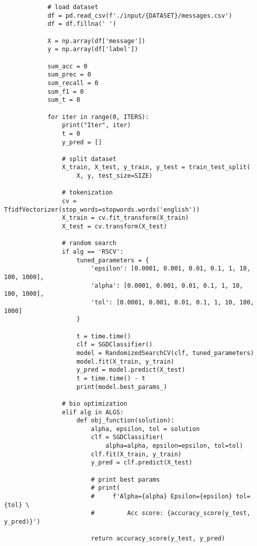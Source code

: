 \begin{lstlisting}
            # load dataset
            df = pd.read_csv(f'./input/{DATASET}/messages.csv')
            df = df.fillna(' ')

            X = np.array(df['message'])
            y = np.array(df['label'])

            sum_acc = 0
            sum_prec = 0
            sum_recall = 0
            sum_f1 = 0
            sum_t = 0

            for iter in range(0, ITERS):
                print("Iter", iter)
                t = 0
                y_pred = []

                # split dataset
                X_train, X_test, y_train, y_test = train_test_split(
                    X, y, test_size=SIZE)

                # tokenization
                cv = TfidfVectorizer(stop_words=stopwords.words('english'))
                X_train = cv.fit_transform(X_train)
                X_test = cv.transform(X_test)

                # random search
                if alg == 'RSCV':
                    tuned_parameters = {
                        'epsilon': [0.0001, 0.001, 0.01, 0.1, 1, 10, 100, 1000],
                        'alpha': [0.0001, 0.001, 0.01, 0.1, 1, 10, 100, 1000],
                        'tol': [0.0001, 0.001, 0.01, 0.1, 1, 10, 100, 1000]
                    }

                    t = time.time()
                    clf = SGDClassifier()
                    model = RandomizedSearchCV(clf, tuned_parameters)
                    model.fit(X_train, y_train)
                    y_pred = model.predict(X_test)
                    t = time.time() - t
                    print(model.best_params_)

                # bio optimization
                elif alg in ALGS:
                    def obj_function(solution):
                        alpha, epsilon, tol = solution
                        clf = SGDClassifier(
                            alpha=alpha, epsilon=epsilon, tol=tol)
                        clf.fit(X_train, y_train)
                        y_pred = clf.predict(X_test)

                        # print best params
                        # print(
                        #     f'Alpha={alpha} Epsilon={epsilon} tol={tol} \
                        #         Acc score: {accuracy_score(y_test, y_pred)}')

                        return accuracy_score(y_test, y_pred)


\end{lstlisting}
